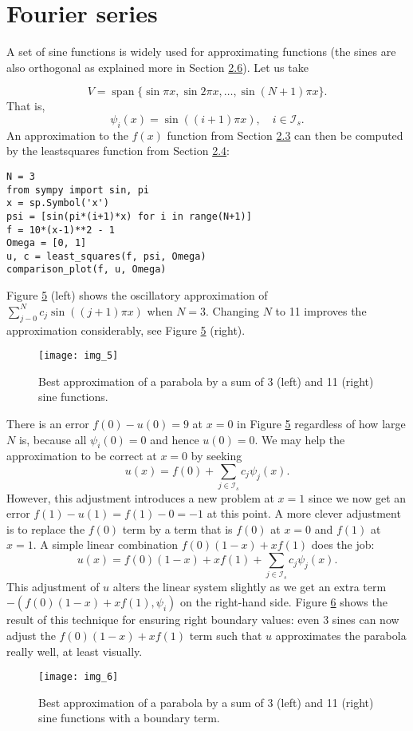 \documentclass[../main.tex]{subfiles}
\begin{document}
\section[Fourier series]{Fourier series}
\label{sec:sec_2_7}
\noindent A set of sine functions is widely used for approximating functions (the sines are
also orthogonal as explained more in Section \hyperref[sec:sec_2_6]{2.6}). Let us take

$$
V=\operatorname{span}\{\sin \pi x, \sin 2 \pi x, \ldots, \sin (N+1) \pi x\}.
$$
That is,
$$
\psi_{i}(x)=\sin ((i+1) \pi x), \quad i \in \mathcal{I}_{s} .
$$
An approximation to the $f(x)$ function from Section \hyperref[sec:sec_2_3]{2.3} can then be computed by the least\textunderscore squares function from Section \hyperref[sec:sec_2_4]{2.4}:
\begin{lstlisting}[numbers=none]
N = 3
from sympy import sin, pi
x = sp.Symbol('x')
psi = [sin(pi*(i+1)*x) for i in range(N+1)]
f = 10*(x-1)**2 - 1
Omega = [0, 1]
u, c = least_squares(f, psi, Omega)
comparison_plot(f, u, Omega)
\end{lstlisting}
Figure \hyperref[fig:img_5]{5} (left) shows the oscillatory approximation of $\sum_{j-0}^{N} c_{j} \sin ((j+1) \pi x)$ when $N=3$. Changing $N$ to 11 improves the approximation considerably, see Figure \hyperref[fig:img_5]{5} (right).
\begin{figure}[H]
	\centering
	\texttt{[image: img\_5]}
	\caption{Best approximation of a parabola by a sum of 3 (left) and 11 (right) sine functions.}
	\label{fig:img_5}
\end{figure}

There is an error $f(0)-u(0)=9$ at $x=0$ in Figure \hyperref[fig:img_5]{5} regardless of how large $N$ is, because all $\psi_{i}(0)=0$ and hence $u(0)=0$. We may help the approximation to be correct at $x=0$ by seeking
\begin{equation}\label{eqa39}
	u(x)=f(0)+\sum_{j \in \mathcal{I}_{s}} c_{j} \psi_{j}(x).
\end{equation}
However, this adjustment introduces a new problem at $x=1$ since we now get an error $f(1)-u(1)=f(1)-0=-1$ at this point. A more clever adjustment is to replace the $f(0)$ term by a term that is $f(0)$ at $x=0$ and $f(1)$ at $x=1$. A simple linear combination $f(0)(1-x)+x f(1)$ does the job:
\begin{equation}\label{eqa40}
	u(x)=f(0)(1-x)+x f(1)+\sum_{j \in \mathcal{I}_{s}} c_{j} \psi_{j}(x).
\end{equation}
\noindent This adjustment of $u$ alters the linear system slightly as we get an extra term $-\left(f(0)(1-x)+x f(1), \psi_{i}\right)$ on the right-hand side. Figure \hyperref[fig:img_6]{6} shows the result of this technique for ensuring right boundary values: even 3 sines can now adjust the $f(0)(1-x)+x f(1)$ term such that $u$ approximates the parabola really well, at least visually.
\begin{figure}[H]
	\centering
	\texttt{[image: img\_6]}
	\caption{Best approximation of a parabola by a sum of 3 (left) and 11 (right)
		sine functions with a boundary term.}
	\label{fig:img_6}
\end{figure}
\end{document}
